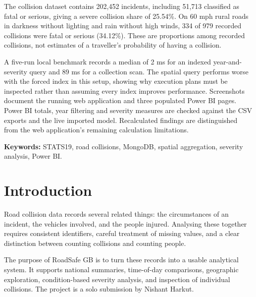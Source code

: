 \documentclass[11pt,a4paper]{article}
\begin{document}
The collision dataset contains 202,452 incidents, including 51,713 classified as fatal or serious, giving a severe collision share of 25.54\%. On 60 mph rural roads in darkness without lighting and rain without high winds, 334 of 979 recorded collisions were fatal or serious (34.12\%). These are proportions among recorded collisions, not estimates of a traveller's probability of having a collision.

A five-run local benchmark records a median of 2 ms for an indexed year-and-severity query and 89 ms for a collection scan. The spatial query performs worse with the forced index in this setup, showing why execution plans must be inspected rather than assuming every index improves performance. Screenshots document the running web application and three populated Power BI pages. Power BI totals, year filtering and severity measures are checked against the CSV exports and the live imported model. Recalculated findings are distinguished from the web application's remaining calculation limitations.

\textbf{Keywords:} STATS19, road collisions, MongoDB, spatial aggregation, severity analysis, Power BI.
\vspace{2mm}
\begingroup\small\tableofcontents\endgroup
\clearpage
{}
\section{Introduction}
Road collision data records several related things: the circumstances of an incident, the vehicles involved, and the people injured. Analysing these together requires consistent identifiers, careful treatment of missing values, and a clear distinction between counting collisions and counting people.

The purpose of RoadSafe GB is to turn these records into a usable analytical system. It supports national summaries, time-of-day comparisons, geographic exploration, condition-based severity analysis, and inspection of individual collisions. The project is a solo submission by Nishant Harkut.
\end{document}
